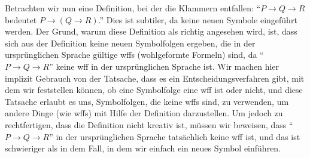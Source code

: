 Betrachten wir nun eine Definition, bei der die Klammern entfallen:  "`$P \rightarrow Q \rightarrow R$ bedeutet $P\rightarrow (Q \rightarrow R)$."' Dies ist subtiler, da keine neuen Symbole eingeführt werden.  Der Grund, warum diese Definition als richtig angesehen wird, ist, dass sich aus der Definition keine neuen Symbolfolgen ergeben, die in der ursprünglichen Sprache gültige wffs (wohlgeformte Formeln) sind, da "`$P \rightarrow Q\rightarrow R$"' keine wff in der ursprünglichen Sprache ist.  Wir machen hier implizit Gebrauch von der Tatsache, dass es ein Entscheidungsverfahren gibt, mit dem wir feststellen können, ob eine Symbolfolge eine wff ist oder nicht, und diese Tatsache erlaubt es uns, Symbolfolgen, die keine wffs sind, zu verwenden, um andere Dinge (wie wffs) mit Hilfe der Definition darzustellen.  Um jedoch zu rechtfertigen, dass die Definition nicht kreativ ist, müssen wir beweisen, dass "`$P \rightarrow Q\rightarrow R$"' in der ursprünglichen Sprache tatsächlich keine wff ist, und das ist schwieriger als in dem Fall, in dem wir einfach ein neues Symbol einführen. 

